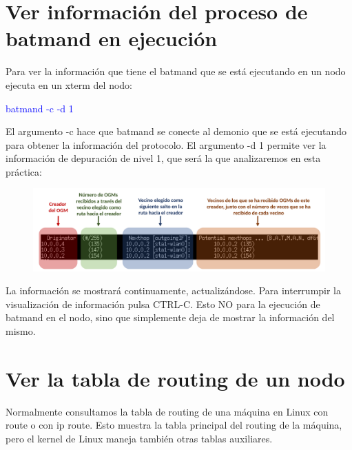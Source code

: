 \documentclass[12pt, a4paper]{report}
\begin{document}
\section*{Ver información del proceso de batmand en ejecución}
Para ver la información que tiene el batmand que se está ejecutando en un nodo ejecuta en un
xterm del nodo:
\begin{center}
	\textcolor{blue}{batmand -c -d 1}
\end{center}
El argumento -c hace que batmand se conecte al demonio que se está ejecutando para obtener la
información del protocolo. El argumento -d 1 permite ver la información de depuración de nivel 1, que
será la que analizaremos en esta práctica:
\begin{figure}[H]
	\centering
	\includegraphics[width=1\textwidth]{enunciado1}
\end{figure}
La información se mostrará continuamente, actualizándose. Para interrumpir la visualización de
información pulsa CTRL-C. Esto NO para la ejecución de batmand en el nodo, sino que simplemente
deja de mostrar la información del mismo.
\section*{Ver la tabla de routing de un nodo}

Normalmente consultamos la tabla de routing de una máquina en Linux con route o con ip route.
Esto muestra la tabla principal del routing de la máquina, pero el kernel de Linux maneja también
otras tablas auxiliares.\\
\end{document}
